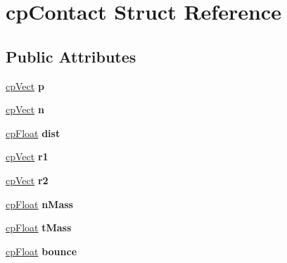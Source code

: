 \hypertarget{structcp_contact}{\section{cp\-Contact Struct Reference}
\label{structcp_contact}
}
\subsection*{Public Attributes}
\begin{DoxyCompactItemize}
\item 
\hypertarget{structcp_contact_acb2d095303df98345b7ca35d9a3291f8}{\hyperlink{structcp_vect}{cp\-Vect} {\bfseries p}}\label{structcp_contact_acb2d095303df98345b7ca35d9a3291f8}

\item 
\hypertarget{structcp_contact_a9d1fa3ee1897e02677b4dae4a31250d6}{\hyperlink{structcp_vect}{cp\-Vect} {\bfseries n}}\label{structcp_contact_a9d1fa3ee1897e02677b4dae4a31250d6}

\item 
\hypertarget{structcp_contact_a153e086d58d6022e64f28db1c081652f}{\hyperlink{group__basic_types_gac1ed65573e035bf892505768c852d8d3}{cp\-Float} {\bfseries dist}}\label{structcp_contact_a153e086d58d6022e64f28db1c081652f}

\item 
\hypertarget{structcp_contact_a30ea3ddb5c7b028cd1ce5d2ee92ac301}{\hyperlink{structcp_vect}{cp\-Vect} {\bfseries r1}}\label{structcp_contact_a30ea3ddb5c7b028cd1ce5d2ee92ac301}

\item 
\hypertarget{structcp_contact_a07adb5206473f2fc05b4344abde787cd}{\hyperlink{structcp_vect}{cp\-Vect} {\bfseries r2}}\label{structcp_contact_a07adb5206473f2fc05b4344abde787cd}

\item 
\hypertarget{structcp_contact_ac5d0505328b0068f47eee7927268f69e}{\hyperlink{group__basic_types_gac1ed65573e035bf892505768c852d8d3}{cp\-Float} {\bfseries n\-Mass}}\label{structcp_contact_ac5d0505328b0068f47eee7927268f69e}

\item 
\hypertarget{structcp_contact_a0ad3ef72cf8b1063953c8539a24a0559}{\hyperlink{group__basic_types_gac1ed65573e035bf892505768c852d8d3}{cp\-Float} {\bfseries t\-Mass}}\label{structcp_contact_a0ad3ef72cf8b1063953c8539a24a0559}

\item 
\hypertarget{structcp_contact_a2d3afaf4917fc1f240b145ba4792a65d}{\hyperlink{group__basic_types_gac1ed65573e035bf892505768c852d8d3}{cp\-Float} {\bfseries bounce}}\label{structcp_contact_a2d3afaf4917fc1f240b145ba4792a65d}


\end{DoxyCompactItemize}
